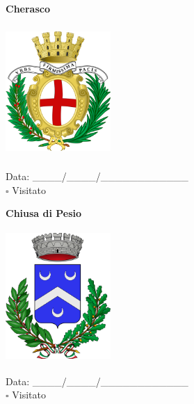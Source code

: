 \documentclass[a5paper,12pt]{article}
\begin{document}
\newpage

\noindent
\begin{minipage}[t]{0.45\textwidth}
    \begin{center}
        \textbf{Cherasco}
    \end{center}
    \vspace{-0.5cm} %
    \begin{center}
        \includegraphics[height= 5cm, width=4cm]{Piemonte/Stemma Cherasco.png}
    \end{center}
    \vspace{-0.4cm} %
    \begin{flushleft}
        Data: \_\_\_\_/\_\_\_\_/\_\_\_\_\_\_\_\_\_\_\_\_ \\
        $\square$ Visitato
    \end{flushleft}
\end{minipage}
\hfill
\noindent
\begin{minipage}[t]{0.45\textwidth}
    \begin{center}
        \textbf{Chiusa di Pesio}
    \end{center}
    \vspace{-0.5cm} %
    \begin{center}
        \includegraphics[height= 5cm, width=4cm]{Piemonte/Stemma Chiusa di Pesio.png}
    \end{center}
    \vspace{-0.4cm} %
    \begin{flushleft}
        Data: \_\_\_\_/\_\_\_\_/\_\_\_\_\_\_\_\_\_\_\_\_ \\
        $\square$ Visitato
    \end{flushleft}
\end{minipage}
\end{document}
